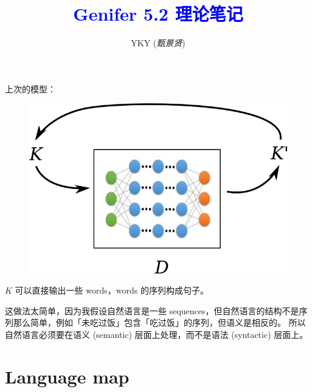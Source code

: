 \documentclass[12pt]{article}
\title{\textcolor{blue}{Genifer 5.2 理论笔记}}
\author{YKY (\textit{甄景贤})}
\newcommand{\tab}{\hspace*{1cm}}
\begin{document}

{\let\newpage\relax\maketitle}

\maketitle
\setlength{\parindent}{0em}
\setlength{\parskip}{1.5ex plus0.5ex minus1.2ex}

上次的模型：
\begin{figure}[H]
\centering
\includegraphics[scale=0.75]{reasoner-model.png}
\end{figure}
$K$ 可以直接输出一些 words，words 的序列构成句子。

这做法太简单，因为我假设自然语言是一些 sequences，但自然语言的结构不是序列那么简单，例如「未吃过饭」包含「吃过饭」的序列，但语义是相反的。 所以自然语言必须要在语义 (semantic) 层面上处理，而不是语法 (syntactic) 层面上。

\section{Language map}
\end{document}
